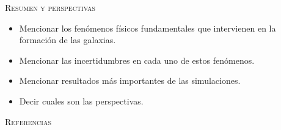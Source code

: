 \documentclass[xcolor=dvipsnames,4pt,hyperref={colorlinks,citecolor=black,linkcolor=black,urlcolor=black}]{beamer}
\begin{document}
\begin{frame}[allowframebreaks]{\textsc{Resumen y perspectivas}}
%
\begin{itemize}
\item Mencionar los fenómenos físicos fundamentales que intervienen en la formación de las galaxias.
\item Mencionar las incertidumbres en cada uno de estos fenómenos.
\item Mencionar resultados más importantes de las simulaciones.
\item Decir cuales son las perspectivas.
\end{itemize}
%
\end{frame}

\begin{frame}[allowframebreaks]{\textsc{Referencias}}
\printbibliography
\end{frame}
\end{document}
